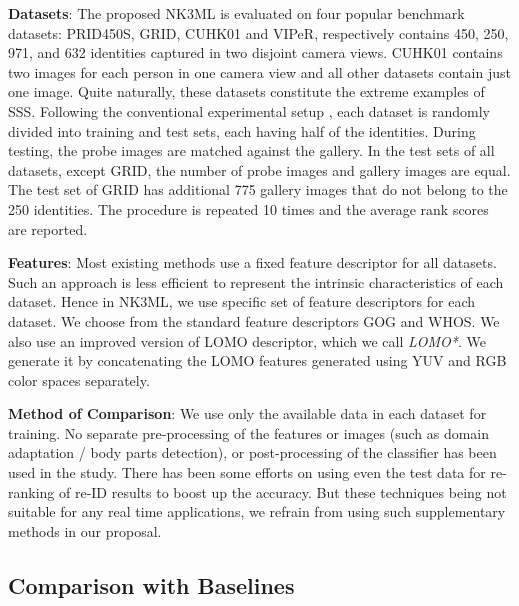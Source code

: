 \documentclass[runningheads]{llncs}
\begin{document}
\setlength{\parskip}{1mm}
\noindent\textbf{Datasets}: The proposed NK3ML is evaluated on four popular benchmark datasets: PRID450S\cite{PRID450S}, GRID\cite{GRID1}, CUHK01\cite{CUHK01} and VIPeR\cite{ELF}, respectively contains 450, 250, 971, and 632 identities captured in two disjoint camera views. 
CUHK01 contains two images for each person in one camera view and all other datasets contain just one image. Quite naturally, these datasets constitute the extreme examples of SSS. Following the conventional experimental setup \cite{song:scalableManifold,GOG,SCSP,LOMO,metric_ensembles,colornames}, each dataset is randomly divided into training and test sets, each having half of the identities. During testing, the probe images are matched against the gallery. In the test sets of all datasets, except GRID, the number of probe images and gallery images are equal. The test set of GRID has additional 775 gallery images that do not belong to the 250 identities. The procedure is repeated 10 times and the average rank scores are reported.

\noindent\textbf{Features}: Most existing methods use a fixed feature descriptor for all datasets. 
Such an approach is less efficient to represent the intrinsic characteristics of each dataset. Hence in NK3ML, we use specific set of feature descriptors for each dataset.
We choose from the standard feature descriptors GOG\cite{GOG} and WHOS\cite{LisantiPAMI14}. We also use an improved version of LOMO\cite{LOMO} descriptor, which we call \textit{LOMO*}. 
We generate it by concatenating the LOMO features generated using YUV and RGB color spaces separately.

\noindent\textbf{Method of Comparison}: We use only the available data in each dataset for training. No separate pre-processing of the features or images (such as domain adaptation / body parts detection), or post-processing of the classifier has been used in the study. There has been some efforts on 
using even the test data for re-ranking of re-ID results \cite{song:scalableManifold,Reranking:kreciprocal,SHaPE} to boost up the accuracy. But these techniques being not suitable for any real time applications, we refrain from using such supplementary methods in our proposal. 
\setlength{\parskip}{0mm}

\subsection{Comparison with Baselines}
\label{ssec:Baselines}
\end{document}
